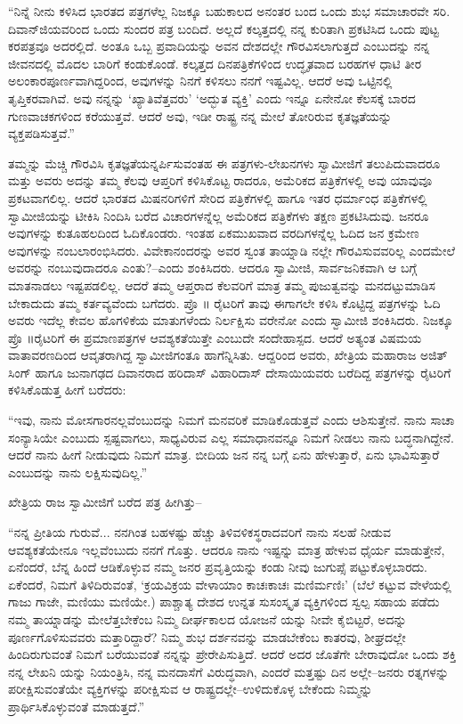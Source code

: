 “ನಿನ್ನೆ ನೀನು ಕಳಿಸಿದ ಭಾರತದ ಪತ್ರಗಳೆಲ್ಲ ನಿಜಕ್ಕೂ ಬಹುಕಾಲದ ಅನಂತರ ಬಂದ ಒಂದು ಶುಭ ಸಮಾಚಾರವೇ ಸರಿ. ದಿವಾನ್​ಜಿಯವರಿಂದ ಒಂದು ಸುಂದರ ಪತ್ರ ಬಂದಿದೆ. ಅಲ್ಲದೆ ಕಲ್ಕತ್ತದಲ್ಲಿ ನನ್ನ ಕುರಿತಾಗಿ ಪ್ರಕಟಿಸಿದ ಒಂದು ಪುಟ್ಟ ಕರಪತ್ರವೂ ಅದರಲ್ಲಿದೆ. ಅಂತೂ ಒಬ್ಬ ಪ್ರವಾದಿಯನ್ನು ಅವನ ದೇಶದಲ್ಲೇ ಗೌರವಿಸಲಾಗುತ್ತದೆ ಎಂಬುದನ್ನು ನನ್ನ ಜೀವನದಲ್ಲಿ ಮೊದಲ ಬಾರಿಗೆ ಕಂಡುಕೊಂಡೆ. ಕಲ್ಕತ್ತದ ದಿನಪತ್ರಿಕೆಗಳಿಂದ ಉದ್ಧೃತವಾದ ಬರಹಗಳ ಧಾಟಿ ತೀರ ಅಲಂಕಾರಪೂರ್ಣವಾಗಿದ್ದರಿಂದ, ಅವುಗಳನ್ನು ನಿನಗೆ ಕಳಿಸಲು ನನಗೆ ಇಷ್ಟವಿಲ್ಲ. ಆದರೆ ಅವು ಒಟ್ಟಿನಲ್ಲಿ ತೃಪ್ತಿಕರವಾಗಿವೆ. ಅವು ನನ್ನನ್ನು ‘ಖ್ಯಾತಿವೆತ್ತವರು’ ‘ಅದ್ಭುತ ವ್ಯಕ್ತಿ’ ಎಂದು ಇನ್ನೂ ಏನೇನೋ ಕೆಲಸಕ್ಕೆ ಬಾರದ ಗುಣವಾಚಕಗಳಿಂದ ಕರೆಯುತ್ತವೆ. ಆದರೆ ಅವು, ಇಡೀ ರಾಷ್ಟ್ರ ನನ್ನ ಮೇಲೆ ತೋರಿರುವ ಕೃತಜ್ಞತೆಯನ್ನು ವ್ಯಕ್ತಪಡಿಸುತ್ತವೆ.”

ತಮ್ಮನ್ನು ಮೆಚ್ಚಿ ಗೌರವಿಸಿ ಕೃತಜ್ಞತೆಯನ್ನರ್ಪಿಸುವಂತಹ ಈ ಪತ್ರಗಳು-ಲೇಖನಗಳು ಸ್ವಾಮೀಜಿಗೆ ತಲುಪಿದುವಾದರೂ ಮತ್ತು ಅವರು ಅದನ್ನು ತಮ್ಮ ಕೆಲವು ಆಪ್ತರಿಗೆ ಕಳಿಸಿಕೊಟ್ಟ ರಾದರೂ, ಅಮೆರಿಕದ ಪತ್ರಿಕೆಗಳಲ್ಲಿ ಅವು ಯಾವುವೂ ಪ್ರಕಟವಾಗಲಿಲ್ಲ. ಆದರೆ ಭಾರತದ ಮಿಷನರಿಗಳಿಗೆ ಸೇರಿದ ಪತ್ರಿಕೆಗಳಲ್ಲಿ ಹಾಗೂ ಇತರ ಧರ್ಮಾಂಧ ಪತ್ರಿಕೆಗಳಲ್ಲಿ ಸ್ವಾಮೀಜಿಯನ್ನು ಟೀಕಿಸಿ ನಿಂದಿಸಿ ಬರೆದ ವಿಚಾರಗಳನ್ನೆಲ್ಲ ಅಮೆರಿಕದ ಪತ್ರಿಕೆಗಳು ತಕ್ಷಣ ಪ್ರಕಟಿಸಿದುವು. ಜನರೂ ಅವುಗಳನ್ನು ಕುತೂಹಲದಿಂದ ಓದಿಕೊಂಡರು. ಇಂತಹ ಏಕಮುಖವಾದ ವರದಿಗಳನ್ನೆಲ್ಲ ಓದಿದ ಜನ ಕ್ರಮೇಣ ಅವುಗಳನ್ನು ನಂಬಲಾರಂಭಿಸಿದರು. ವಿವೇಕಾನಂದರನ್ನು ಅವರ ಸ್ವಂತ ತಾಯ್ನಾಡಿ ನಲ್ಲೇ ಗೌರವಿಸುವವರಿಲ್ಲ ಎಂದಮೇಲೆ ಅವರನ್ನು ನಂಬುವುದಾದರೂ ಎಂತು?–ಎಂದು ಶಂಕಿಸಿದರು. ಆದರೂ ಸ್ವಾಮೀಜಿ, ಸಾರ್ವಜನಿಕವಾಗಿ ಆ ಬಗ್ಗೆ ಮಾತನಾಡಲು ಇಷ್ಟಪಡಲಿಲ್ಲ. ಆದರೆ ತಮ್ಮ ಆಪ್ತರಾದ ಕೆಲವರಿಗೆ ಮಾತ್ರ ತಮ್ಮ ಪುಜುತ್ವವನ್ನು ಮನದಟ್ಟುಮಾಡಿಸ ಬೇಕಾದುದು ತಮ್ಮ ಕರ್ತವ್ಯವೆಂದು ಬಗೆದರು. ಪ್ರೊ ॥ ರೈಟರಿಗೆ ತಾವು ಈಗಾಗಲೇ ಕಳಿಸಿ ಕೊಟ್ಟಿದ್ದ ಪತ್ರಗಳನ್ನು ಓದಿ ಅವರು ಇದೆಲ್ಲ ಕೇವಲ ಹೊಗಳಿಕೆಯ ಮಾತುಗಳೆಂದು ನಿರ್ಲಕ್ಷಿಸು ವರೇನೋ ಎಂದು ಸ್ವಾಮೀಜಿ ಶಂಕಿಸಿದರು. ನಿಜಕ್ಕೂ ಪ್ರೊ ॥ರೈಟರಿಗೆ ಈ ಪ್ರಮಾಣಪತ್ರಗಳ ಆವಶ್ಯಕತೆಯಿತ್ತೇ ಎಂಬುದೇ ಸಂದೇಹಾಸ್ಪದ. ಆದರೆ ಅತ್ಯಂತ ವಿಷಮಯ ವಾತಾವರಣದಿಂದ ಆವೃತರಾಗಿದ್ದ ಸ್ವಾಮೀಜಿಗಂತೂ ಹಾಗೆನ್ನಿಸಿತು. ಆದ್ದರಿಂದ ಅವರು, ಖೇತ್ರಿಯ ಮಹಾರಾಜ ಅಜಿತ್​ಸಿಂಗ್ ಹಾಗೂ ಜುನಾಗಢದ ದಿವಾನರಾದ ಹರಿದಾಸ್ ವಿಹಾರಿದಾಸ್ ದೇಸಾಯಿಯವರು ಬರೆದಿದ್ದ ಪತ್ರಗಳನ್ನು ರೈಟರಿಗೆ ಕಳಿಸಿಕೊಡುತ್ತ ಹೀಗೆ ಬರೆದರು:

“ಇವು, ನಾನು ಮೋಸಗಾರನಲ್ಲವೆಂಬುದನ್ನು ನಿಮಗೆ ಮನವರಿಕೆ ಮಾಡಿಕೊಡುತ್ತವೆ ಎಂದು ಆಶಿಸುತ್ತೇನೆ. ನಾನು ಸಾಚಾ ಸಂನ್ಯಾಸಿಯೇ ಎಂಬುದು ಸ್ಪಷ್ಟವಾಗಲು, ಸಾಧ್ಯವಿರುವ ಎಲ್ಲ ಸಮಾಧಾನವನ್ನೂ ನಿಮಗೆ ನೀಡಲು ನಾನು ಬದ್ಧನಾಗಿದ್ದೇನೆ. ಆದರೆ ನಾನು ಹೀಗೆ ನೀಡುವುದು ನಿಮಗೆ ಮಾತ್ರ. ಬೀದಿಯ ಜನ ನನ್ನ ಬಗ್ಗೆ ಏನು ಹೇಳುತ್ತಾರೆ, ಏನು ಭಾವಿಸುತ್ತಾರೆ ಎಂಬುದನ್ನು ನಾನು ಲಕ್ಷಿಸುವುದಿಲ್ಲ.”

ಖೇತ್ರಿಯ ರಾಜ ಸ್ವಾಮೀಜಿಗೆ ಬರೆದ ಪತ್ರ ಹೀಗಿತ್ತು–

“ನನ್ನ ಪ್ರೀತಿಯ ಗುರುವೆ... ನನಗಿಂತ ಬಹಳಷ್ಟು ಹೆಚ್ಚು ತಿಳಿವಳಿಕಸ್ಥರಾದವರಿಗೆ ನಾನು ಸಲಹೆ ನೀಡುವ ಆವಶ್ಯಕತೆಯೇನೂ ಇಲ್ಲವೆಂಬುದು ನನಗೆ ಗೊತ್ತು. ಆದರೂ ನಾನು ಇಷ್ಟನ್ನು ಮಾತ್ರ ಹೇಳುವ ಧೈರ್ಯ ಮಾಡುತ್ತೇನೆ, ಏನೆಂದರೆ, ಬೆನ್ನ ಹಿಂದೆ ಆಡಿಕೊಳ್ಳುವ ನಮ್ಮ ಜನರ ಪ್ರವೃತ್ತಿಯನ್ನು ಕಂಡು ನೀವು ಜುಗುಪ್ಸೆ ಪಟ್ಟುಕೊಳ್ಳಬಾರದು. ಏಕೆಂದರೆ, ನಿಮಗೆ ತಿಳಿದಿರುವಂತೆ, ‘ಕ್ರಯವಿಕ್ರಯ ವೇಳಾಯಾಂ ಕಾಚಃಕಾಚಃ ಮಣಿರ್ಮಣಿಃ’ (ಬೆಲೆ ಕಟ್ಟುವ ವೇಳೆಯಲ್ಲಿ ಗಾಜು ಗಾಜೇ, ಮಣಿಯು ಮಣಿಯೇ.) ಪಾಶ್ಚಾತ್ಯ ದೇಶದ ಉನ್ನತ ಸುಸಂಸ್ಕೃತ ವ್ಯಕ್ತಿಗಳಿಂದ ಸ್ವಲ್ಪ ಸಹಾಯ ಪಡೆದು ನಮ್ಮ ತಾಯ್ನಾಡನ್ನು ಮೇಲೆತ್ತಬೇಕೆಂಬ ನಿಮ್ಮ ದೀರ್ಘಕಾಲದ ಯೋಜನೆ ಯನ್ನು ನೀವೇ ಕೈಬಿಟ್ಟರೆ, ಅದನ್ನು ಪೂರ್ಣಗೊಳಿಸುವವರು ಮತ್ತಾರಿದ್ದಾರೆ? ನಿಮ್ಮ ಶುಭ ದರ್ಶನವನ್ನು ಮಾಡಬೇಕೆಂಬ ಕಾತರವು, ಶೀಘ್ರದಲ್ಲೇ ಹಿಂದಿರುಗುವಂತೆ ನಿಮಗೆ ಬರೆಯುವಂತೆ ನನ್ನನ್ನು ಪ್ರೇರೇಪಿಸುತ್ತಿದೆ. ಆದರೆ ಅದರ ಜೊತೆಗೇ ಬೇರಾವುದೋ ಒಂದು ಶಕ್ತಿ ನನ್ನ ಲೇಖನಿ ಯನ್ನು ನಿಯಂತ್ರಿಸಿ, ನನ್ನ ಮನದಾಸೆಗೆ ವಿರುದ್ಧವಾಗಿ, ಎಂದರೆ ಮತ್ತಷ್ಟು ದಿನ ಅಲ್ಲೇ–ಜನರು ರತ್ನಗಳನ್ನು ಪರೀಕ್ಷಿಸುವಂತೆಯೇ ವ್ಯಕ್ತಿಗಳನ್ನು ಪರೀಕ್ಷಿಸುವ ಆ ರಾಷ್ಟ್ರದಲ್ಲೇ–ಉಳಿದುಕೊಳ್ಳ ಬೇಕೆಂದು ನಿಮ್ಮನ್ನು ಪ್ರಾರ್ಥಿಸಿಕೊಳ್ಳುವಂತೆ ಮಾಡುತ್ತದೆ.”

